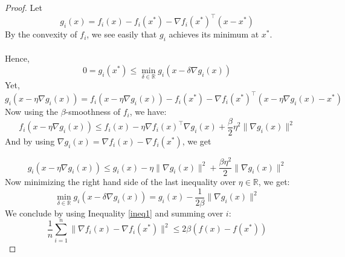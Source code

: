 \documentclass[12pt]{report}
\begin{document}
\begin{proof}
Let 
$$g_i(x)=f_i(x)-f_i(x^*)-\nabla f_i(x^*)^\top(x-x^*)$$
By the convexity of $f_i$, we see easily that $g_i$ achieves its minimum at $x^*$.\\
\\Hence, 
\begin{equation}\label{ineq1}
0=g_i(x^*)\leq \min_{\delta\in\mathbb{R}} g_i\left(x-\delta\nabla g_i(x)\right)
\end{equation}
Yet, $g_i\left(x-\eta\nabla g_i(x)\right)=f_i(x-\eta\nabla g_i(x))-f_i(x^*)-\nabla f_i(x^*)^\top(x-\eta\nabla g_i(x)-x^*)$\\

Now using the $\beta$-smoothness of $f_i$, we have:
$$f_i\left(x-\eta\nabla g_i(x)\right)\leq f_i(x) -\eta\nabla f_i(x)^\top\nabla g_i(x)+\frac{\beta}{2}\eta^2\|\nabla g_i(x)\|^2$$
And by using  
$\nabla g_i(x)=\nabla f_i(x)-\nabla f_i(x^*) $, we get

$$g_i\left(x-\eta\nabla g_i(x)\right)\leq g_i(x)-\eta\|\nabla g_i(x) \|^2+\frac{\beta\eta^2}{2}\|\nabla g_i(x)\|^2 $$
Now minimizing the right hand side of the last inequality over $\eta\in\mathbb{R}$, we get:
$$ \min_{\delta\in\mathbb{R}} g_i\left(x-\delta\nabla g_i(x)\right)=g_i(x)-\frac{1}{2\beta}\|\nabla g_i(x)\|^2$$
We conclude by using Inequality \ref{ineq1} and summing over $i$:
$$\frac{1}{n}\sum_{i=1}^n\|\nabla f_i(x)-\nabla f_i(x^*)\|^2\leq 2\beta(f(x)-f(x^*))$$
\end{proof}
\end{document}
